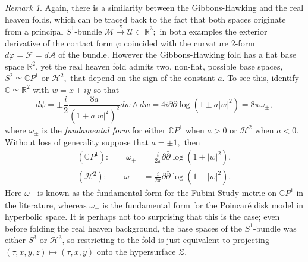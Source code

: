 \documentclass[a4paper,12pt, onecolumn, notitlepage]{article}
\theoremstyle{definition}
\theoremstyle{remark}
\newtheorem{rmk}[thm]{Remark}
\newcommand{\w}{\omega}
\newcommand{\vp}{\varphi}
\begin{document}
\begin{rmk}
	Again, there is a similarity between the Gibbons-Hawking and the real heaven folds, which can be traced back to the fact that both spaces originate from a principal $S^{1}$-bundle $\mathcal{M}\overset{\pi}{\rightarrow}\mathcal{U}\subset\mathbb{R}^{3};$ in both examples the exterior derivative of the contact form $\vp$ coincided with the curvature 2-form $d\vp=\mathcal{F}=d\mathcal{A}$ of the bundle. However the Gibbons-Hawking fold has a flat base space $\mathbb{R}^{2}$, yet the real heaven fold admits two, non-flat, possible base spaces, $S^{2}\simeq \mathbb{C}P^{1}$ or $\mathcal{H}^{2},$ that depend on the sign of the constant $a.$ To see this, identify $\mathbb{C}\simeq\mathbb{R}^{2}$ with $w=x+iy$ so that
	\begin{equation}
		d\psi=\pm\frac{i}{2}\frac{8a}{(1+a|w|^{2})^{2}}dw\wedge d\bar{w} = 4i\partial\bar{\partial}\log(1\pm a|w|^{2}) = 8\pi\w_{\pm},
	\end{equation}
	where $\w_{\pm}$ is the \emph{fundamental form} for either $\mathbb{C}P^{1}$ when $a>0$ or $\mathcal{H}^{2}$ when $a<0.$ Without loss of generality suppose that $a = \pm 1,$ then
	\begin{subequations}
		\begin{align}
		\label{fubini}
		(\mathbb{C}P^{1}):\qquad \w_{+} &= \frac{i}{2\pi}\partial\bar{\partial}\log(1+|w|^{2}),\\
		\label{poincare}
		(\mathcal{H}^{2}):\qquad \w_{-} &= \frac{i}{2\pi}\partial\bar{\partial}\log(1-|w|^{2}).
		\end{align} 
	\end{subequations}
	Here $\w_{+}$ is known as the fundamental form for the Fubini-Study metric on $\mathbb{C}P^{1}$ in the literature, whereas $\w_{-}$ is the fundamental form for the Poincar\'{e} disk model in hyperbolic space. It is perhaps not too surprising that this is the case; even before folding the real heaven background, the base spaces of the $S^{1}$-bundle was either $S^{3}$ or $\mathcal{H}^{3}$, so restricting to the fold is just equivalent to projecting $(\tau, x, y, z)\mapsto(\tau, x, y)$ onto the hypersurface $\mathcal{Z}.$
\end{rmk}
\end{document}
